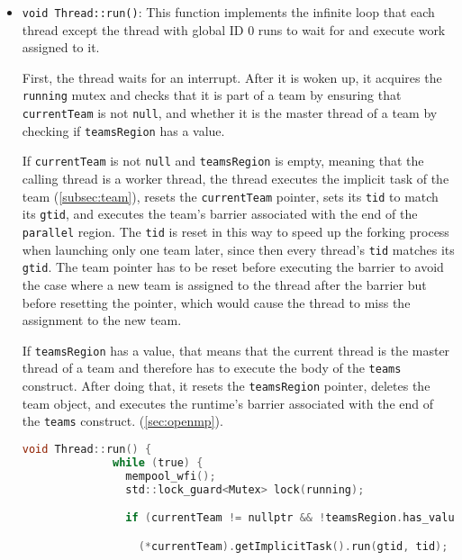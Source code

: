 \begin{itemize}
	\item \texttt{void Thread::run()}: This function implements the infinite loop that each thread
	      except the thread with global ID 0 runs to wait for and execute work assigned to it.

	      First, the thread waits for an interrupt. After it is woken up, it acquires the \texttt{running}
	      mutex and checks that it is part of a team by ensuring that \texttt{currentTeam} is not
	      \texttt{null}, and whether it is the master thread of a team by checking if
	      \texttt{teamsRegion} has a value.

	      If \texttt{currentTeam} is not \texttt{null} and \texttt{teamsRegion} is empty, meaning
	      that the calling thread is a worker thread, the thread executes the implicit task of the
	      team (\cref{subsec:team}), resets the \texttt{currentTeam} pointer, sets its \texttt{tid}
	      to match its \texttt{gtid}, and executes the team's barrier associated with the end of the
	      \texttt{parallel} region. The \texttt{tid} is reset in this way to speed up the forking
	      process when launching only one team later, since then every thread's \texttt{tid} matches
	      its \texttt{gtid}. The team pointer has to be reset before executing the barrier to avoid
	      the case where a new team is assigned to the thread after the barrier but before resetting
	      the pointer, which would cause the thread to miss the assignment to the new team.

	      If \texttt{teamsRegion} has a value, that means that the current thread is the master
	      thread of a team and therefore has to execute the body of the \texttt{teams} construct.
	      After doing that, it resets the \texttt{teamsRegion} pointer, deletes the team object, and
	      executes the runtime's barrier associated with the end of the \texttt{teams} construct.
	      (\cref{sec:openmp}).

	      \begin{lstlisting}[language=C, caption={Thread::run}, label={lst:thread-run},
          escapechar=@]
            void Thread::run() {
              while (true) {
                mempool_wfi();
                std::lock_guard<Mutex> lock(running);

                if (currentTeam != nullptr && !teamsRegion.has_value()) {

                  (*currentTeam).getImplicitTask().run(gtid, tid);


\end{lstlisting}
\end{itemize}
